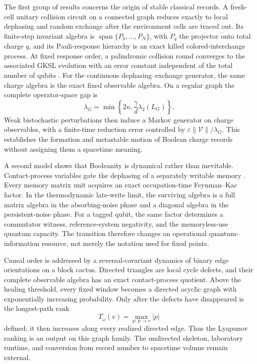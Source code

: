 \documentclass[11pt]{article}
\begin{document}
The first group of results concerns the origin of stable classical records.
A fresh-cell unitary collision circuit on a connected graph reduces exactly
to local dephasing and random exchange after the environment cells are
traced out.  Its finite-step invariant algebra is
\(\operatorname{span}\{P_0,\ldots,P_N\}\), with \(P_q\) the projector onto
total charge \(q\), and its Pauli-response hierarchy is an exact killed
colored-interchange process.  At fixed response order, a palindromic
collision round converges to the associated GKSL evolution with an error
constant independent of the total number of qubits
\cite{Lindblad1976,Gorini1976}.  For the continuous
dephasing--exchange generator, the same charge algebra is the exact fixed
observable algebra.  On a regular graph the complete operator-space gap is
\[
 \lambda_G=\min\!\left\{2\kappa,
  \frac{\gamma}{d}\lambda_2(L_G)\right\}.
\]
Weak bistochastic perturbations then induce a Markov generator on charge
observables, with a finite-time reduction error controlled by
\(\varepsilon\|\mathcal V\|/\lambda_G\).  This establishes the formation and
metastable motion of Boolean charge records without assigning them a
spacetime meaning.

A second model shows that Booleanity is dynamical rather than inevitable.
Contact-process variables gate the dephasing of a separately writable
memory \cite{Harris1974,Liggett1999}.  Every memory matrix unit acquires an
exact occupation-time Feynman--Kac factor.  In the thermodynamic late-write
limit, the surviving algebra is a full matrix algebra in the
absorbing-noise phase and a diagonal algebra in the persistent-noise phase.
For a tagged qubit, the same factor determines a commutator witness,
reference-system negativity, and the memoryless-use quantum capacity.  The
transition therefore changes an operational quantum-information resource,
not merely the notation used for fixed points.

Causal order is addressed by a reversal-covariant dynamics of binary edge
orientations on a block cactus.  Directed triangles are local cycle defects,
and their complete observable algebra has an exact contact-process quotient.
Above the healing threshold, every fixed window becomes a directed acyclic
graph with exponentially increasing probability.  Only after the defects
have disappeared is the longest-path rank
\[
 T_\omega(v)=\max_{p:\,p\to v}|p|
\]
defined; it then increases along every realized directed edge.  Thus the
Lyapunov ranking is an output on this graph family.  The undirected skeleton,
laboratory runtime, and conversion from record number to spacetime volume
remain external.
\end{document}
